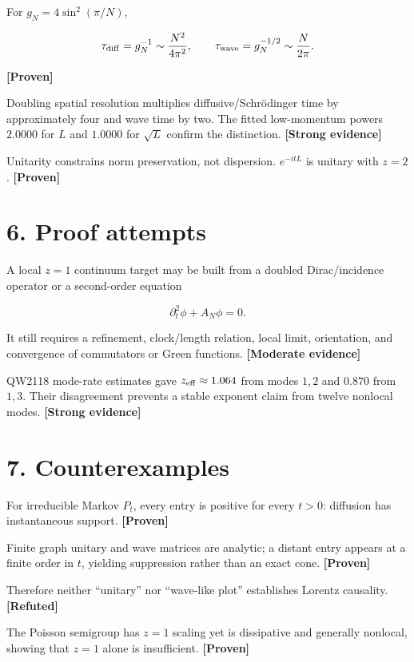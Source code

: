 \documentclass[11pt,a4paper,openany]{report}
\newcommand{\statusProven}{\textcolor{fingreen}{[Proven]}}
\newcommand{\statusStrong}{\textcolor{finblue}{[Strong evidence]}}
\newcommand{\statusModerate}{\textcolor{finviolet}{[Moderate evidence]}}
\newcommand{\statusRefuted}{\textcolor{finred}{[Refuted]}}
\begin{document}
For \(g_N=4\sin^2(\pi/N)\),

\[
\tau_{\rm diff}=g_N^{-1}\sim\frac{N^2}{4\pi^2},
\qquad
\tau_{\rm wave}=g_N^{-1/2}\sim\frac{N}{2\pi}.
\]

\textbf{\statusProven{}}

Doubling spatial resolution multiplies diffusive/\allowbreak{}Schrödinger time by approximately four and wave time by two. The fitted low-momentum powers \(2.0000\) for \(L\) and \(1.0000\) for \(\sqrt L\) confirm the distinction. \textbf{\statusStrong{}}

Unitarity constrains norm preservation, not dispersion. \(e^{-itL}\) is unitary with \(z=2\). \textbf{\statusProven{}}

\section{6. Proof attempts}

A local \(z=1\) continuum target may be built from a doubled Dirac/\allowbreak{}incidence operator or a second-order equation

\[
\partial_t^2\phi+A_N\phi=0.
\]

It still requires a refinement, clock/\allowbreak{}length relation, local limit, orientation, and convergence of commutators or Green functions. \textbf{\statusModerate{}}

QW2118 mode-rate estimates gave \(z_{\rm eff}\approx1.064\) from modes \(1,2\) and \(0.870\) from \(1,3\). Their disagreement prevents a stable exponent claim from twelve nonlocal modes. \textbf{\statusStrong{}}

\section{7. Counterexamples}

For irreducible Markov \(P_t\), every entry is positive for every \(t>0\): diffusion has instantaneous support. \textbf{\statusProven{}}

Finite graph unitary and wave matrices are analytic; a distant entry appears at a finite order in \(t\), yielding suppression rather than an exact cone. \textbf{\statusProven{}}

Therefore neither “unitary” nor “wave-like plot” establishes Lorentz causality. \textbf{\statusRefuted{}}

The Poisson semigroup has \(z=1\) scaling yet is dissipative and generally nonlocal, showing that \(z=1\) alone is insufficient. \textbf{\statusProven{}}
\end{document}
